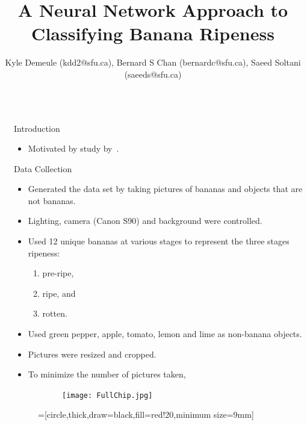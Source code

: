 \documentclass[final]{beamer}
\title{A Neural Network Approach to Classifying Banana Ripeness}
\author{Kyle Demeule (kdd2@sfu.ca), Bernard S Chan (bernardc@sfu.ca), Saeed Soltani (saeeds@sfu.ca)}
\institute{Department Computing Science, Faculty of Applied Sciences, Simon Fraser University}
\newlength{\sepwid}
\newlength{\onecolwid}
\begin{document}
\begin{frame}[t]
  \begin{columns}[t]												%
    \begin{column}{\sepwid}\end{column}			%
    \begin{column}{\onecolwid}
\begin{block}{Introduction}
\begin{itemize}
\item Motivated by study by~\citet{saad2009recognizing}.
\end{itemize}
 
\begin{alertblock}{Data Collection }
\begin{itemize}
\item Generated the data set by taking pictures of bananas and objects that are not bananas.
\item Lighting, camera (Canon S90) and background were controlled. 
\item Used 12 unique bananas at various stages to represent the three stages ripeness: 
\begin{enumerate}
\item pre-ripe, 
\item ripe, and 
\item rotten. 
\end{enumerate}
\item Used green pepper, apple, tomato, lemon and lime as non-banana objects. 
\item Pictures were resized and cropped. 
\item To minimize the number of pictures taken, 
\end{itemize}
 \begin{figure}
  \begin{subfigure}{.28\textwidth}
  \centering
\texttt{[image: FullChip.jpg]}
\caption{}
\label{fig:gyroscopeChip}
\end{subfigure}%
\def\radius {4cm}
\def\margin{15}
\def \n {5}
\def \margin {15} 
  =[circle,thick,draw=black,fill=red!20,minimum size=9mm]
  \begin{subfigure}{.325\textwidth}
  \centering
\begin{tikzpicture}


\end{tikzpicture}
\end{subfigure}
\end{figure}
\end{alertblock}
\end{block}
\end{column}
\end{columns}
\end{frame}
\end{document}

